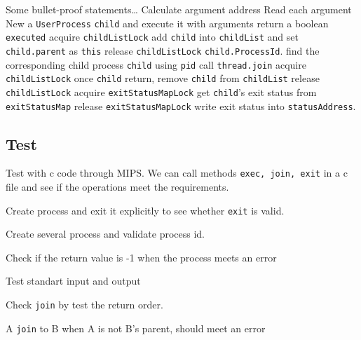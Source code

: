 \documentclass{article}
\begin{document}
\begin{algorithm*}
	\begin{algorithmic}
					\State Some bullet-proof statements\dots
						\State Calculate argument address
						\State Read each argument
					\EndFor
					\State New a \texttt{UserProcess} \texttt{child} and execute it with arguments return a boolean \texttt{executed}
						\State acquire \texttt{childListLock}
						\State add \texttt{child} into \texttt{childList} and set \texttt{child.parent} as \texttt{this}
						\State release \texttt{childListLock}
					\Else 
						\State {}
					\EndIf
					\State \Return \texttt{child.ProcessId}.
				\EndProcedure
					\State find the corresponding child process \texttt{child} using \texttt{pid}
						\State call \texttt{thread.join}
					\EndFor
					\State acquire \texttt{childListLock}
					\State once \texttt{child} return, remove \texttt{child} from \texttt{childList}
					\State release \texttt{childListLock}
					\State acquire \texttt{exitStatusMapLock}
					\State get \texttt{child}'s exit status from \texttt{exitStatusMap}
					\State release \texttt{exitStatusMapLock}
					\State write exit status into \texttt{statusAddress}.
				\EndProcedure
    \end{algorithmic}
\end{algorithm*}
\subsection{Test}
Test with c code through MIPS. We can call methods \texttt{exec, join, exit} in a c file and see if 
the operations meet the requirements.
\begin{compactitem}
\item Create process and exit it explicitly to see whether \texttt{exit} is valid.
\item Create several process and validate process id.
\item Check if the return value is -1 when the process meets an error
\item Test standart input and output
\item Check \texttt{join} by test the return order.
\item A \texttt{join} to B when A is not B's parent, should meet an error
\end{compactitem}
\end{document}

